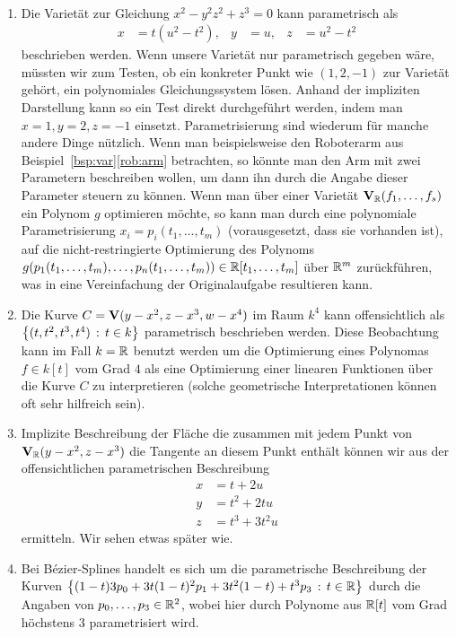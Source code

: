 \documentclass[11pt]{article}
\numberwithin{equation}{section}
\begin{document}
\begin{beispiele} {\ } 
\begin{enumerate} 
	\item Die Varietät zur Gleichung $x^2 - y^2 z^2 + z^3 =0$ kann parametrisch als 
\begin{align*}
		x & = t (u^2 - t^2),  &  y & =u,  &  z & = u^2 - t^2
\end{align*} 
beschrieben werden. 
Wenn unsere Varietät nur parametrisch gegeben wäre, müssten wir zum Testen, ob ein konkreter Punkt wie $(1,2,-1)$ zur Varietät gehört, ein polynomiales Gleichungssystem lösen. Anhand  der impliziten Darstellung kann so ein Test direkt durchgeführt werden, indem man $x=1, y=2, z=-1$ einsetzt. Parametrisierung sind wiederum für manche andere Dinge nützlich. Wenn man beispielsweise den Roboterarm aus Beispiel~\ref{bsp:var}\eqref{rob:arm} betrachten, so könnte man den Arm mit zwei Parametern beschreiben wollen, um dann ihn durch die Angabe dieser Parameter steuern zu können. Wenn man über einer Varietät $\mathbf{V}_{\mathbb{R}}(f_1,\ldots,f_s)$ ein Polynom $g$ optimieren möchte, so kann man durch eine polynomiale Parametrisierung $x_i = p_i(t_1,\ldots,t_m)$ (vorausgesetzt, dass  sie vorhanden ist), auf die nicht-restringierte Optimierung des Polynoms $g(p_1(t_1,\ldots,t_m),\ldots,p_n(t_1,\ldots,t_m)) \in \mathbb{R}[t_1,\ldots,t_m]$ über $\mathbb{R}^m$ zurückführen, was in eine Vereinfachung der Originalaufgabe resultieren kann. 

	\item Die Kurve $C=\mathbf{V}(y -x^2, z-x^3, w - x^4)$ im Raum $k^4$ kann offensichtlich als $\left\{  (t,t^2, t^3,t^4)  \,:\, t \in k \right\}$ parametrisch beschrieben werden. Diese Beobachtung kann im Fall $k=\mathbb{R}$ benutzt werden um die Optimierung eines Polynomas $f \in k[t]$ vom Grad $4$ als eine Optimierung einer linearen Funktionen über die Kurve $C$ zu interpretieren (solche geometrische Interpretationen können oft sehr hilfreich sein). 
	
	\item Implizite Beschreibung der Fläche die zusammen mit jedem Punkt von $\mathbf{V}_{\mathbb{R}}(y - x^2, z - x^3)$ die Tangente an diesem Punkt enthält können wir aus der offensichtlichen parametrischen Beschreibung 
	\begin{align*}
			x & = t + 2 u 
		\\	y & = t^2 + 2 t u
		\\	z & = t^3 + 3  t^2 u 
	\end{align*} 
	ermitteln. Wir sehen etwas später wie. 
	\item Bei B\'ezier-Splines handelt es sich um die parametrische Beschreibung der Kurven $ \left\{  (1-t)3 p_0 + 3 t (1-t)^2 p_1 + 3 t^2 (1-t) + t^3  p_3  \,:\, t \in \mathbb{R} \right\}$ durch die Angaben von $p_0,\ldots,p_3 \in \mathbb{R}^2$, wobei hier durch Polynome aus $\mathbb{R}[t]$ vom Grad höchstens $3$ parametrisiert wird. 
\end{enumerate} 
\end{beispiele} 
\end{document}
